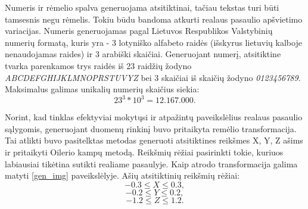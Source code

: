 \documentclass{VUMIFInfBakalaurinis}
\begin{document}
Numeris ir rėmelio spalva generuojama atsitiktinai, tačiau tekstas turi būti tamsesnis negu rėmelis. Tokiu būdu bandoma atkurti realaus pasaulio apšvietimo variacijas.
Numeris generuojamas pagal Lietuvos Respublikos Valstybinių numerių formatą, kuris yra - 3 lotyniško alfabeto
raidės (išskyrus lietuvių kalboje nenaudojamas raides) ir 3 arabiški skaičiai. Generuojant numerį, 
atsitiktine tvarka parenkamos trys raidės iš 23 raidžių žodyno \textit{ABCDEFGHIJKLMNOPRSTUVYZ} bei 3 skaičiai 
iš skaičių žodyno \textit{0123456789}. Maksimalus galimas unikalių numerių skaičius siekia:
\begin{equation}
  23^3 * 10^3 = 12.167.000.
\end{equation}


Norint, kad tinklas efektyviai mokytųsi ir atpažintų paveikslėlius realaus pasaulio sąlygomis, generuojant duomenų
rinkinį buvo pritaikyta remėlio transformacija. Tai atlikti buvo pasitelktas metodas generuoti atsitiktines
reikšmes X, Y, Z ašims ir pritaikyti Oilerio kampų metodą\cite{slabaugh1999computing}. 
Reikšmių rėžiai pasirinkti tokie, kuriuos labiausiai tikėtina sutikti realiame pasaulyje.
Kaip atrodo transformacija galima matyti \ref{gen_img} paveikslėlyje.
Ašių atsitiktinių reikšmių rėžiai:
\begin{equation}
  -0.3 \leq X \leq 0.3,
\end{equation}
\begin{equation}
  -0.2 \leq Y \leq 0.2,
\end{equation}
\begin{equation}
  -1.2 \leq Z \leq 1.2.
\end{equation}
\end{document}
